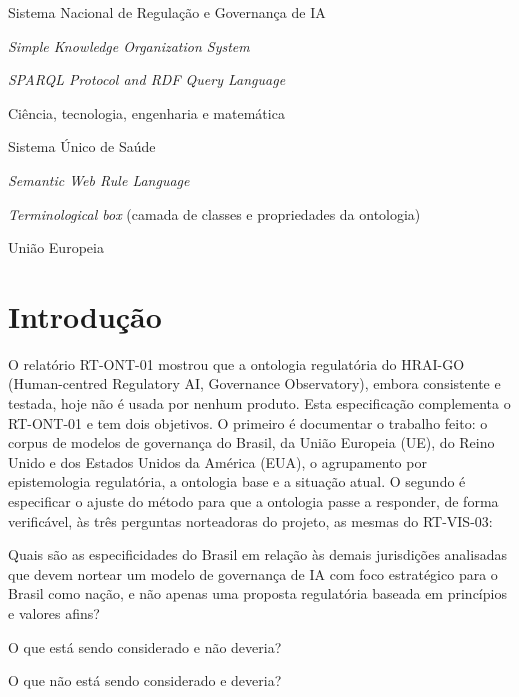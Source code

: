 \documentclass[12pt,a4paper,oneside,english,brazil]{abntex2}
\begin{document}
\begin{siglas}
  \item[SIA] Sistema Nacional de Regulação e Governança de IA
  \item[SKOS] \emph{Simple Knowledge Organization System}
  \item[SPARQL] \emph{SPARQL Protocol and RDF Query Language}
  \item[STEM] Ciência, tecnologia, engenharia e matemática
  \item[SUS] Sistema Único de Saúde
  \item[SWRL] \emph{Semantic Web Rule Language}
  \item[TBox] \emph{Terminological box} (camada de classes e propriedades da ontologia)
  \item[UE] União Europeia
\end{siglas}

\tableofcontents*
\cleardoublepage

\textual

\chapter{Introdução}\label{cap:intro}

O relatório RT-ONT-01 mostrou que a ontologia regulatória do HRAI-GO (Human-centred Regulatory AI, Governance Observatory), embora consistente e testada, hoje não é usada por nenhum produto. Esta especificação complementa o RT-ONT-01 e tem dois objetivos. O primeiro é documentar o trabalho feito: o corpus de modelos de governança do Brasil, da União Europeia (UE), do Reino Unido e dos Estados Unidos da América (EUA), o agrupamento por epistemologia regulatória, a ontologia base e a situação atual. O segundo é especificar o ajuste do método para que a ontologia passe a responder, de forma verificável, às três perguntas norteadoras do projeto, as mesmas do RT-VIS-03:
\begin{description}[style=nextline,leftmargin=12mm,labelindent=0pt]
  \item[QN1] Quais são as especificidades do Brasil em relação às demais jurisdições analisadas que devem nortear um modelo de governança de IA com foco estratégico para o Brasil como nação, e não apenas uma proposta regulatória baseada em princípios e valores afins?
  \item[QN2] O que está sendo considerado e não deveria?
  \item[QN3] O que não está sendo considerado e deveria?
\end{description}
\end{document}
